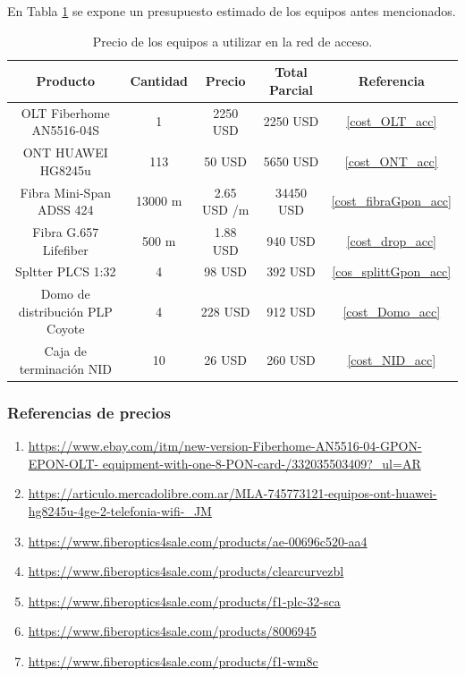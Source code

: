 \documentclass[12pt,a4paper]{book}
\begin{document}
\medskip

En Tabla \ref{tabla_preciosEquipos_fibra_acc} se expone un presupuesto estimado de los equipos antes mencionados.

\medskip

\begin{table} [H]
\centering
\begin{tabular}{|c|c|c|c|c|}
\hline 
Producto & Cantidad & Precio & Total Parcial & Referencia \\ 
\hline 
OLT Fiberhome AN5516-04S & 1 & 2250 USD & 2250 USD & \ref{cost_OLT_acc}\\ 
\hline 
ONT HUAWEI HG8245u & 113 & 50 USD & 5650 USD & \ref{cost_ONT_acc}\\ 
\hline 
Fibra Mini-Span ADSS 424 & 13000 m & 2.65 USD /m & 34450 USD & \ref{cost_fibraGpon_acc}\\ 
\hline 
Fibra G.657 Lifefiber & 500 m & 1.88 USD & 940 USD & \ref{cost_drop_acc}\\
\hline
Spltter PLCS 1:32 & 4 & 98 USD & 392 USD & \ref{cos_splittGpon_acc}\\ 
\hline
Domo de distribución PLP Coyote & 4 & 228 USD & 912 USD & \ref{cost_Domo_acc}\\
\hline
Caja de terminación NID & 10 & 26 USD & 260 USD & \ref{cost_NID_acc}\\
\hline 
\end{tabular} 
\caption{Precio de los equipos a utilizar en la red de acceso.}
\label{tabla_preciosEquipos_fibra_acc}
\end{table}

\subsubsection{Referencias de precios}
\begin{enumerate}
\item \label{cost_OLT_acc} 
\url{ https://www.ebay.com/itm/new-version-Fiberhome-AN5516-04-GPON-EPON-OLT-
equipment-with-one-8-PON-card-/332035503409?_ul=AR} 
\item \label{cost_ONT_acc}
\url{ https://articulo.mercadolibre.com.ar/MLA-745773121-equipos-ont-huawei-
hg8245u-4ge-2-telefonia-wifi-_JM}
\item  \label{cost_fibraGpon_acc}
\url{ https://www.fiberoptics4sale.com/products/ae-00696c520-aa4}
\item \label{cost_drop_acc}
\url{ https://www.fiberoptics4sale.com/products/clearcurvezbl}
\item  \label{cos_splittGpon_acc}
\url{ https://www.fiberoptics4sale.com/products/f1-plc-32-sca}
\item \label{cost_Domo_acc}
\url{ https://www.fiberoptics4sale.com/products/8006945}
\item \label{cost_NID_acc}
\url{ https://www.fiberoptics4sale.com/products/f1-wm8c}
\end{enumerate}
\end{document}
